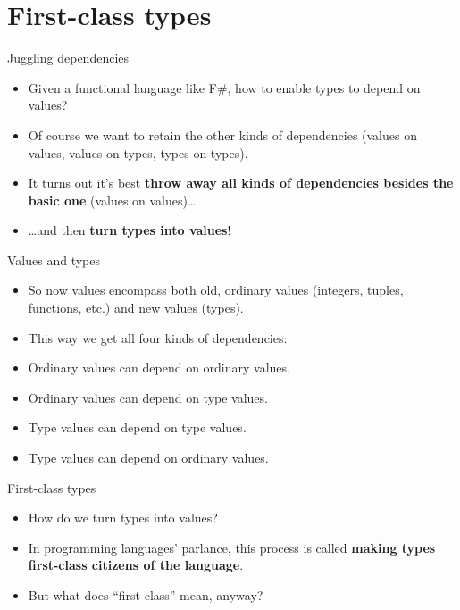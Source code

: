 \documentclass{beamer}
\begin{document}
\section{First-class types}

\begin{frame}{Juggling dependencies}
\begin{itemize}
	\item Given a functional language like F\#, how to enable types to depend on values?
	\item Of course we want to retain the other kinds of dependencies (values on values, values on types, types on types).
	\item It turns out it's best \textbf{throw away all kinds of dependencies besides the basic one} (values on values)\dots
	\item \dots and then \textbf{turn types into values}!
\end{itemize}
\end{frame}

\begin{frame}{Values and types}
\begin{itemize}
	\item So now values encompass both old, ordinary values (integers, tuples, functions, etc.) and new values (types).
	\item This way we get all four kinds of dependencies:
	\item Ordinary values can depend on ordinary values.
	\item Ordinary values can depend on type values.
	\item Type values can depend on type values.
	\item Type values can depend on ordinary values.
\end{itemize}
\end{frame}

\begin{frame}{First-class types}
\begin{itemize}
	\item How do we turn types into values?
	\item In programming languages' parlance, this process is called \textbf{making types first-class citizens of the language}.
	\item But what does ``first-class'' mean, anyway?
\end{itemize}
\end{frame}
\end{document}
